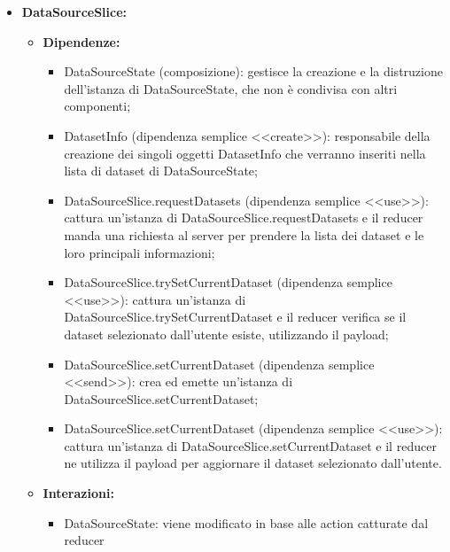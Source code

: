 \begin{itemize}
      \item \textbf{DataSourceSlice:}
            \begin{itemize}
                  \item \textbf{Dipendenze:}
                        \begin{itemize}
                              \item DataSourceState (composizione): gestisce la creazione e la distruzione
                                    dell'istanza di DataSourceState, che non è condivisa con altri componenti;
                              \item DatasetInfo (dipendenza semplice <<create>>): responsabile della creazione dei
                                    singoli oggetti DatasetInfo che verranno inseriti nella lista di dataset di
                                    DataSourceState;
                              \item DataSourceSlice.requestDatasets (dipendenza semplice <<use>>): cattura
                                    un'istanza di DataSourceSlice.requestDatasets e il reducer manda una richiesta
                                    al server per prendere la lista dei dataset e le loro principali informazioni;
                              \item DataSourceSlice.trySetCurrentDataset (dipendenza semplice <<use>>): cattura
                                    un'istanza di DataSourceSlice.trySetCurrentDataset e il reducer verifica se il
                                    dataset selezionato dall'utente esiste, utilizzando il payload;
                              \item DataSourceSlice.setCurrentDataset (dipendenza semplice <<send>>): crea ed
                                    emette un'istanza di DataSourceSlice.setCurrentDataset;
                              \item DataSourceSlice.setCurrentDataset (dipendenza semplice <<use>>): cattura
                                    un'istanza di DataSourceSlice.setCurrentDataset e il reducer ne utilizza il
                                    payload per aggiornare il dataset selezionato dall'utente.
                        \end{itemize}
                  \item \textbf{Interazioni:}
                        \begin{itemize}
                              \item DataSourceState: viene modificato in base alle action catturate dal reducer

\end{itemize}
\end{itemize}
\end{itemize}
